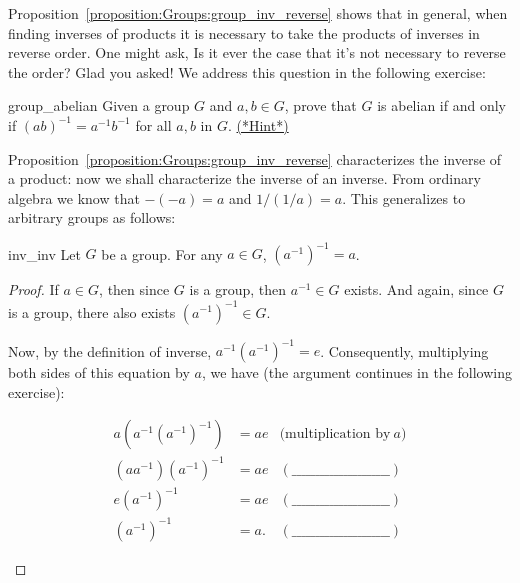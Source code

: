 Proposition~\ref{proposition:Groups:group_inv_reverse} shows that in general, when finding inverses of products it is necessary to take the products of inverses in reverse order. One might ask, Is it ever the case that it's not necessary to reverse the order? Glad you asked! We address this question in the following exercise: 

\begin{exercise}{group_abelian}
Given a group $G$ and $a, b \in G$, prove that $G$ is abelian if and only if $(ab)^{-1} =a^{-1}b^{-1}$ for all $a,b$ in $G$.
\hyperref[sec:Groups:Hints]{(*Hint*)} 
\end{exercise}
 
Proposition~\ref{proposition:Groups:group_inv_reverse} characterizes the inverse of a product: now we shall characterize the inverse of an inverse. From ordinary algebra we know that $-(-a) = a$ and $1/(1/a) = a$. This generalizes to arbitrary groups as follows:

\begin{prop}{inv_inv}
Let $G$ be a group.  For any $a \in G$, $(a^{-1})^{-1} = a$.
\end{prop}
 
\begin{proof}
If $a \in G$, then since $G$ is a group, then $a^{-1} \in G$ exists.  And again, since $G$ is a group, there also exists $(a^{-1})^{-1} \in G$.

Now, by the definition of inverse, $a^{-1} (a^{-1})^{-1} = e$. Consequently, multiplying both sides of this equation by $a$, we have  (the argument continues in the following exercise):

\begin{exercise}{44}
\begin{align*}
a(a^{-1}(a^{-1})^{-1}) & = ae &\mbox{(multiplication by}~a)\\
(aa^{-1})(a^{-1})^{-1} & = ae   &(\_\_\_\_\_\_\_\_\_\_\_\_\_\_\_\_\_\_\_\_\_) \\
e(a^{-1})^{-1} & = ae   &(\_\_\_\_\_\_\_\_\_\_\_\_\_\_\_\_\_\_\_\_\_) \\
(a^{-1})^{-1} &= a.  &(\_\_\_\_\_\_\_\_\_\_\_\_\_\_\_\_\_\_\_\_\_)
\end{align*}
\end{exercise}
\end{proof}

